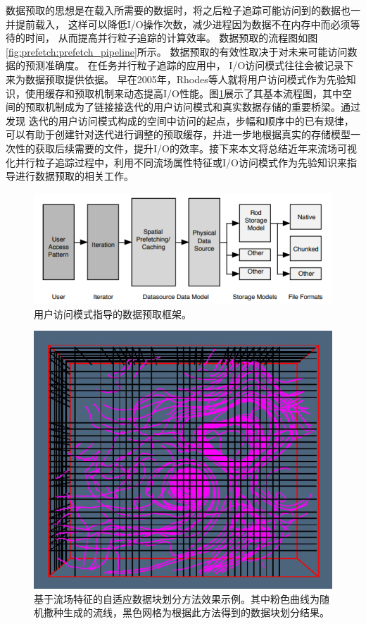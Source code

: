 数据预取的思想是在载入所需要的数据时，将之后粒子追踪可能访问到的数据也一并提前载入，
这样可以降低I/O操作次数，减少进程因为数据不在内存中而必须等待的时间，
从而提高并行粒子追踪的计算效率。
数据预取的流程图如图\ref{fig:prefetch:prefetch_pipeline}所示。
数据预取的有效性取决于对未来可能访问数据的预测准确度。
在任务并行粒子追踪的应用中，
I/O访问模式往往会被记录下来为数据预取提供依据。 
早在2005年，Rhodes等人\parencite{RhodesTBS05}就将用户访问模式作为先验知识，使用缓存和预取机制来动态提高I/O性能。图\ref{fig:prefetch:initial_prefetch}展示了其基本流程图，其中空间的预取机制成为了链接接迭代的用户访问模式和真实数据存储的重要桥梁。通过发现
迭代的用户访问模式构成的空间中访问的起点，步幅和顺序中的已有规律，可以有助于创建针对迭代进行调整的预取缓存，并进一步地根据真实的存储模型一次性的获取后续需要的文件，提升I/O的效率。接下来本文将总结近年来流场可视化并行粒子追踪过程中，利用不同流场属性特征或I/O访问模式作为先验知识来指导进行数据预取的相关工作。

\begin{figure}[!tb]
  \centering
  \includegraphics[width=\linewidth,keepaspectratio]{image/prefetch/initial_prefetch_patternbased.png}
  \caption{
   用户访问模式指导的数据预取框架\parencite{RhodesTBS05}。
 }
\label{fig:prefetch:initial_prefetch}
\end{figure}


\begin{figure}[!tb]
  \centering
  \includegraphics[width=.55\linewidth,keepaspectratio]{image/prefetch/block_partition.png}
  \caption{
   基于流场特征的自适应数据块划分方法效果示例\parencite{Guo2017WL}。其中粉色曲线为随机撒种生成的流线，黑色网格为根据此方法得到的数据块划分结果。
 }
\label{fig:prefetch:block_partition}
\end{figure}


